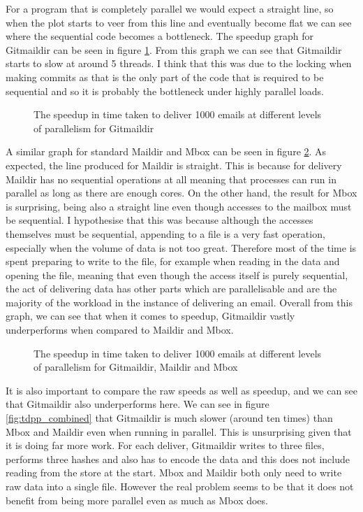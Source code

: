 For a program that is completely parallel we would expect a straight line, so when the plot starts to veer from this line and eventually become flat we can see where the sequential code becomes a bottleneck. The speedup graph for Gitmaildir can be seen in figure \ref{fig:tdpp_speedup}. From this graph we can see that Gitmaildir starts to slow at around 5 threads. I think that this was due to the locking when making commits as that is the only part of the code that is required to be sequential and so it is probably the bottleneck under highly parallel loads.

\begin{figure}[h]
    \centering
    
    \caption{The speedup in time taken to deliver 1000 emails at different levels of parallelism for Gitmaildir}
    \label{fig:tdpp_speedup}
\end{figure}

A similar graph for standard Maildir and Mbox can be seen in figure \ref{fig:tdpp_speedup_combined}. As expected, the line produced for Maildir is straight. This is because for delivery Maildir has no sequential operations at all meaning that processes can run in parallel as long as there are enough cores. On the other hand, the result for Mbox is surprising, being also a straight line even though accesses to the mailbox must be sequential. I hypothesise that this was because although the accesses themselves must be sequential, appending to a file is a very fast operation, especially when the volume of data is not too great. Therefore most of the time is spent preparing to write to the file, for example when reading in the data and opening the file, meaning that even though the access itself is purely sequential, the act of delivering data has other parts which are parallelisable and are the majority of the workload in the instance of delivering an email. Overall from this graph, we can see that when it comes to speedup, Gitmaildir vastly underperforms when compared to Maildir and Mbox.

\begin{figure}[h]
    \centering
    
    \caption{The speedup in time taken to deliver 1000 emails at different levels of parallelism for Gitmaildir, Maildir and Mbox}
    \label{fig:tdpp_speedup_combined}
\end{figure}

It is also important to compare the raw speeds as well as speedup, and we can see that Gitmaildir also underperforms here. We can see in figure \ref{fig:tdpp_combined} that Gitmaildir is much slower (around ten times) than Mbox and Maildir even when running in parallel. This is unsurprising given that it is doing far more work. For each deliver, Gitmaildir writes to three files, performs three hashes and also has to encode the data and this does not include reading from the store at the start. Mbox and Maildir both only need to write raw data into a single file. However the real problem seems to be that it does not benefit from being more parallel even as much as Mbox does.

